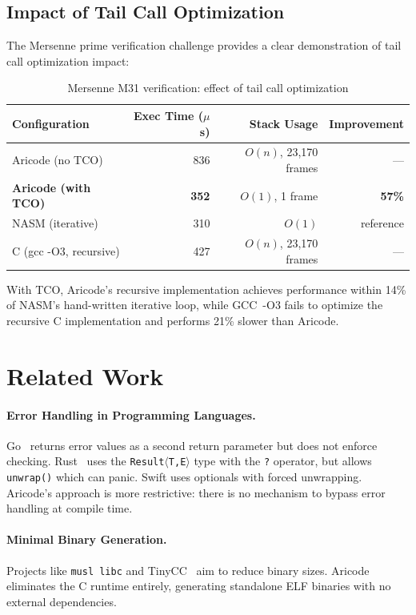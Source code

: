\documentclass[11pt,a4paper]{article}
\begin{document}
\subsection{Impact of Tail Call Optimization}

The Mersenne prime verification challenge provides a clear demonstration of tail call optimization impact:

\begin{table}[H]
\centering
\caption{Mersenne M31 verification: effect of tail call optimization}
\label{tab:tco}
\begin{tabular}{@{}lrrr@{}}
\toprule
\textbf{Configuration} & \textbf{Exec Time ($\mu$s)} & \textbf{Stack Usage} & \textbf{Improvement} \\
\midrule
Aricode (no TCO)  & 836 & $O(n)$, 23{,}170 frames & --- \\
\textbf{Aricode (with TCO)} & \textbf{352} & $O(1)$, 1 frame & \textbf{57\%} \\
NASM (iterative)  & 310 & $O(1)$ & reference \\
C (gcc -O3, recursive) & 427 & $O(n)$, 23{,}170 frames & --- \\
\bottomrule
\end{tabular}
\end{table}

With TCO, Aricode's recursive implementation achieves performance within 14\% of NASM's hand-written iterative loop, while GCC~-O3 fails to optimize the recursive C implementation and performs 21\% slower than Aricode.

\section{Related Work}
\label{sec:related}

\paragraph{Error Handling in Programming Languages.}
Go~\cite{go2012} returns error values as a second return parameter but does not enforce checking. Rust~\cite{rust2015} uses the \texttt{Result$\langle$T,E$\rangle$} type with the \texttt{?} operator, but allows \texttt{unwrap()} which can panic. Swift uses optionals with forced unwrapping. Aricode's approach is more restrictive: there is no mechanism to bypass error handling at compile time.

\paragraph{Minimal Binary Generation.}
Projects like \texttt{musl libc} and TinyCC~\cite{bellard2001} aim to reduce binary sizes. Aricode eliminates the C runtime entirely, generating standalone ELF binaries with no external dependencies.
\end{document}
